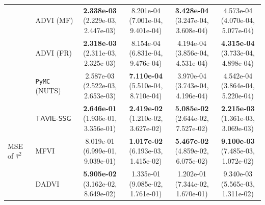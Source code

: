\documentclass[12pt]{article}
\numberwithin{equation}{section}
\newcommand{\tssg}{\mathsf{TAVIE}\text{-}\mathsf{SSG}}
\begin{document}
{\begin{longtable}{llcccc}
& ADVI (MF)
& \makecell[c]{\textbf{2.338e-03}\\(2.229e-03, 2.447e-03)}
& \makecell[c]{8.201e-04\\(7.001e-04, 9.401e-04)}
& \makecell[c]{\textbf{3.428e-04}\\(3.247e-04, 3.608e-04)}
& \makecell[c]{4.573e-04\\(4.070e-04, 5.077e-04)} \\

& ADVI (FR)
& \makecell[c]{\textbf{2.318e-03}\\(2.311e-03, 2.325e-03)}
& \makecell[c]{8.154e-04\\(6.831e-04, 9.476e-04)}
& \makecell[c]{4.194e-04\\(3.856e-04, 4.531e-04)}
& \makecell[c]{\textbf{4.315e-04}\\(3.733e-04, 4.898e-04)} \\

& \texttt{PyMC} (NUTS)
& \makecell[c]{2.587e-03\\(2.522e-03, 2.653e-03)}
& \makecell[c]{\textbf{7.110e-04}\\(5.510e-04, 8.710e-04)}
& \makecell[c]{3.970e-04\\(3.743e-04, 4.196e-04)}
& \makecell[c]{4.542e-04\\(3.864e-04, 5.220e-04)} \\
\hline

\multirow{6}{*}{MSE of $\widehat{\tau}^{2}$}
& $\tssg$
& \makecell[c]{\textbf{2.646e-01}\\(1.936e-01, 3.356e-01)}
& \makecell[c]{\textbf{2.419e-02}\\(1.210e-02, 3.627e-02)}
& \makecell[c]{\textbf{5.085e-02}\\(2.644e-02, 7.527e-02)}
& \makecell[c]{\textbf{2.215e-03}\\(1.361e-03, 3.069e-03)} \\

& MFVI
& \makecell[c]{8.019e-01\\(6.999e-01, 9.039e-01)}
& \makecell[c]{\textbf{1.017e-02}\\(6.193e-03, 1.415e-02)}
& \makecell[c]{\textbf{5.467e-02}\\(4.859e-02, 6.075e-02)}
& \makecell[c]{\textbf{9.100e-03}\\(7.485e-03, 1.072e-02)} \\

& DADVI
& \makecell[c]{\textbf{5.905e-02}\\(3.162e-02, 8.649e-02)}
& \makecell[c]{1.335e-01\\(9.085e-02, 1.761e-01)}
& \makecell[c]{1.202e-01\\(7.344e-02, 1.670e-01)}
& \makecell[c]{9.340e-03\\(5.565e-03, 1.311e-02)} \\


\end{longtable}}
\end{document}
